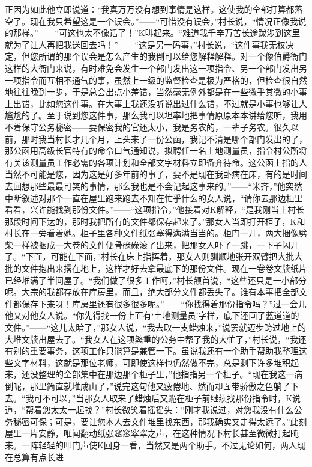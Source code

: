\documentclass[12pt,a4paper]{article}
\begin{document}
正因为如此他立即说道：“我真万万没有想到事情是这样。这使我的全部打算都落空了。现在我只希望这是一个误会。”——“可惜没有误会，”村长说，“情况正像我说的那样。”——“可这也太不像话了！”K叫起来。“难道我千辛万苦长途跋涉到这里就为了让人再把我送回去吗！”——“这是另一码事，”村长说，“这件事我无权决定，但您所谓的那个误会是怎么产生的我倒可以给您解释解释。对一个像伯爵衙门这样的大衙门来说，有时难免会发生一个部门发出这一项指令、另一个部门发出另一项指令而互相不通气的事，虽然上一级的监督检查是极为严格的，但检查很自然地往往晚到一步，于是总会出点小差错，当然毫无例外都是在一些微乎其微的小事上出错，比如您这件事。在大事上我还没听说出过什么错，不过就是小事也够让人尴尬的了。至于说到您这件事，那么我可以坦率地把事情原原本本讲给您听，我用不着保守公务秘密——要保密我的官还太小，我是务农的，一辈子务农。很久以前，那时我当村长才几个月，上头来了一份公函，我记不清是哪个部门发出的了，那公函用高级长官特有的命令口气通知说，拟聘任一名土地测量员，指令村公所将有关该测量员工作必需的各项计划和全部文字材料立即备齐待命。这公函上指的人当然不可能是您，因为这是好多年前的事了，要不是现在我卧病在床，有的是时间去回想那些最最可笑的事情，那么我也是不会记起这事来的。”——“米齐，”他突然中断叙述对那个一直在屋里跑来跑去不知在忙乎什么的女人说，“请你去那边柜里看看，兴许能找到那份文件。”——“这项指令，”他接着对K解释，“是我刚当上村长那段时间下达的，那时我把所有的文件都保存起来了。”那女人当即打开柜子，K和村长在一旁看着她。柜子里各种文件纸张塞得满满当当的。柜门一开，两大捆像劈柴一样被捆成一大卷的文件便骨碌碌滚了出来，把那女人吓了一跳，一下子闪开了。“下面，可能在下面，”村长在床上指挥着，那女人则驯顺地张开双臂把大批大批的文件抱出来撂在地上，这样才好去拿最底下的那份文件。现在一卷卷文牍纸片已经堆满了半间屋子。“我们做了很多工作呵，”村长颔首说，“这些还只是一小部分呢。大宗的我都存放在库房里，而且，绝大部分文件都丢失了。谁有本事把全部文件都保存下来呀！库房里还有很多很多呢。”——“你找得着那份指令吗？”过一会儿他又对他女人说。“你先得找一份上面有‘土地测量员’字样，底下还画了蓝道道的文件。”——“这儿太暗了，”那女人说，“我去取一支蜡烛来，”说罢就迈步跨过地上的大堆文牍出屋去了。“我女人在这项繁重的公务中帮了我的大忙了，”村长说，“我还有别的重要事务，这项工作只能算是兼管一下。虽说我还有一个助手帮助我整理这些文字材料，这就是那位老师，可即使这样也仍然做不完，总是剩下许多堆积起来，还没整理的全部集中在那边那个柜子里，”他指指另一个柜子。“现在我这一病倒呢，那里简直就堆成山了，”说完这句他又疲倦地、然而却面带骄傲之色躺了下去。“我可不可以，”当那女人取来了蜡烛后又跪在柜子前继续找那份指令时，K说道，“帮着您太太一起找？”村长微笑着摇摇头：“刚才我说过，对您我没有什么公务秘密可保；可是，要让您本人去文件堆里找东西，那我确实又走得太远了。”此刻屋里一片安静，唯闻翻动纸张窸窸窣窣之声，在这种情况下村长甚至微微打起盹来。一阵轻轻的叩门声使K回身一看，当然又是两个助手。不过无论如何，两人现在总算有点长进
\end{document}
